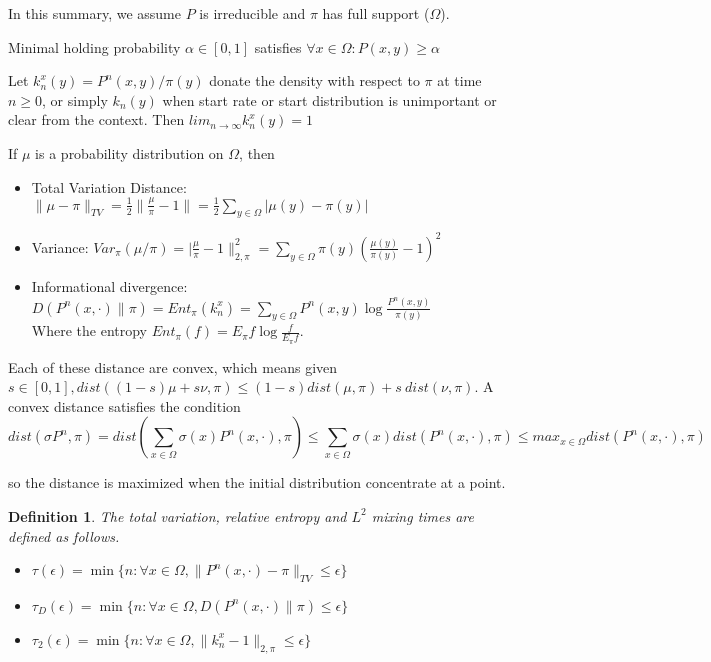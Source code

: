 \documentclass[12pt,reqno]{amsart}
\newtheorem{definition}[thm]{Definition}
{ \theoremstyle{remark}\newtheorem*{remark}{Remark} }
\begin{document}
In this summary, we assume $P$ is irreducible and $\pi$ has full support ($\Omega$).

Minimal holding probability $\alpha \in [0,1]$ satisfies $\forall x\in \Omega:
P(x,y) \geq \alpha$

Let $k_n^x(y)=P^n(x,y)/\pi(y)$ donate the density with respect to $\pi$ at time $n\geq 0$, or simply $k_n(y)$ when start rate or start distribution is unimportant or clear from the context. Then $lim_{n\rightarrow \infty}k_n^x(y) = 1$

If $\mu$ is a probability distribution on $\Omega$, then
\begin{itemize}
\item Total Variation Distance: 
  $\|\mu-\pi\|_{TV} = \frac{1}{2}\|\frac{\mu}{\pi} -1 \| = 
  \frac{1}{2} \sum_{y\in\Omega} |\mu(y)-\pi(y)|$
\item Variance:
  $Var_{\pi}(\mu/\pi) = |\frac{\mu}{\pi}-1 \|_{2,\pi}^2 = 
  \sum_{y\in\Omega}\pi(y)(\frac{\mu(y)}{\pi(y)} -1)^2$
\item Informational divergence:
  $D(P^n(x,\cdot)\|\pi) = Ent_{\pi}(k_n^x) = 
  \sum_{y\in\Omega}P^n(x,y)\log\frac{P^n(x,y)}{\pi(y)}$\\
  Where the entropy $Ent_{\pi}(f)=E_{\pi}f\log\frac{f}{E_{\pi}f}$.
\end{itemize}
Each of these distance are convex, which means given $s\in[0,1], dist((1-s)\mu + s\nu, \pi)\leq (1-s)dist(\mu,\pi) + s~dist(\nu,\pi)$. A convex distance satisfies the condition
\begin{equation}
  \label{eq:1.1}
dist(\sigma P^n,\pi) = dist  (\sum_{x\in\Omega}\sigma(x)P^n(x,\cdot),\pi )
\leq \sum_{x\in\Omega}\sigma(x) dist( P^n(x,\cdot),\pi )
\leq max_{x\in\Omega}dist( P^n(x,\cdot),\pi ) 
\end{equation}



so the distance is maximized when the initial distribution concentrate at a point.

\begin{definition}
The total variation, relative entropy and $L^2$ mixing times are defined as follows.
\begin{itemize}
\item $\tau(\epsilon) = \min\{n:\forall x\in \Omega, \|P^n(x,\cdot)-\pi\|_{TV}\leq \epsilon\}$
\item $\tau_D(\epsilon) = \min\{n:\forall x\in \Omega, D(P^n(x,\cdot)\|\pi) \leq \epsilon\}$
\item $\tau_2(\epsilon) = \min\{n:\forall x\in \Omega, \|k_n^x-1\|_{2,\pi} \leq \epsilon\}$
\end{itemize}
\end{definition}
\end{document}

